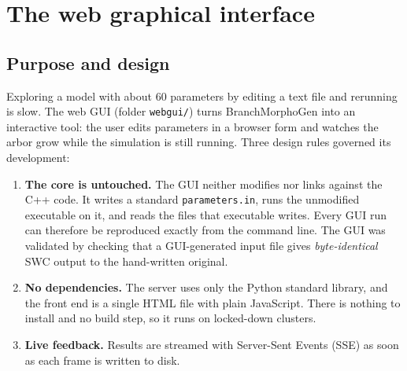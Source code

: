 \documentclass[11pt,a4paper]{article}
\newcommand{\code}[1]{\texttt{#1}}
\begin{document}
\section{The web graphical interface}\label{sec:gui}
\subsection{Purpose and design}
Exploring a model with about 60 parameters by editing a text file and rerunning is slow. The web GUI (folder \code{webgui/}) turns BranchMorphoGen into an interactive tool: the user edits parameters in a browser form and watches the arbor grow while the simulation is still running. Three design rules governed its development:
\begin{enumerate}
  \item \textbf{The core is untouched.} The GUI neither modifies nor links against the C++ code. It writes a standard \code{parameters.in}, runs the unmodified executable on it, and reads the files that executable writes. Every GUI run can therefore be reproduced exactly from the command line. The GUI was validated by checking that a GUI-generated input file gives \emph{byte-identical} SWC output to the hand-written original.
  \item \textbf{No dependencies.} The server uses only the Python standard library, and the front end is a single HTML file with plain JavaScript. There is nothing to install and no build step, so it runs on locked-down clusters.
  \item \textbf{Live feedback.} Results are streamed with Server-Sent Events (SSE) as soon as each frame is written to disk.
\end{enumerate}
\end{document}
